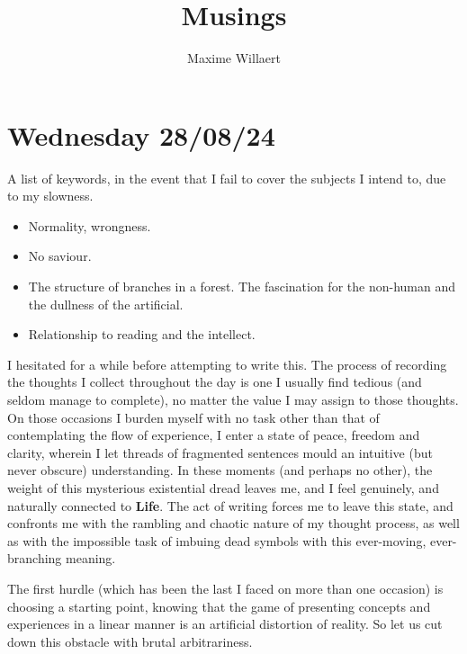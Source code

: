\documentclass[a4paper,12pt,parskip=half*,chapterprefix=true,numbers=noendperiod]{scrreprt}
\title{Musings}
\author{Maxime Willaert}
\theoremstyle{definition}
\theoremstyle{remark}
\begin{document}
\maketitle

\tableofcontents

\section{Wednesday 28/08/24}

A list of keywords, in the event that I fail to cover the subjects I intend to, due to my slowness.
\begin{itemize}
	\item Normality, wrongness.
	\item No saviour.
	\item The structure of branches in a forest. The fascination for the non-human and the dullness of the artificial.
	\item Relationship to reading and the intellect.
\end{itemize}

I hesitated for a while before attempting to write this. The process of recording the thoughts I collect throughout the day is one I usually find tedious (and seldom manage to complete), no matter the value I may assign to those thoughts. On those occasions I burden myself with no task other than that of contemplating the flow of experience, I enter a state of peace, freedom and clarity, wherein I let threads of fragmented sentences mould an intuitive (but never obscure) understanding. In these moments (and perhaps no other), the weight of this mysterious existential dread leaves me, and I feel genuinely, and naturally connected to \textbf{Life}. The act of writing forces me to leave this state, and confronts me with the rambling and chaotic nature of my thought process, as well as with the impossible task of imbuing dead symbols with this ever-moving, ever-branching meaning.

The first hurdle (which has been the last I faced on more than one occasion) is choosing a starting point, knowing that the game of presenting concepts and experiences in a linear manner is an artificial distortion of reality. So let us cut down this obstacle with brutal arbitrariness.
\end{document}
